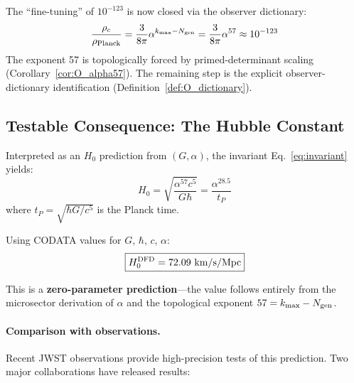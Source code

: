 \begin{tcolorbox}[colback=blue!5!white, colframe=blue!60!black, title=Cosmological Constant: Dictionary-Closed Resolution (Appendix~\ref{app:O_alpha57_clean})]
The ``fine-tuning'' of $10^{-123}$ is now closed via the observer dictionary:
\begin{equation}
\frac{\rho_c}{\rho_{\rm Planck}} = \frac{3}{8\pi}\alpha^{k_{\max} - N_{\rm gen}} = \frac{3}{8\pi}\alpha^{57} \approx 10^{-123}
\end{equation}
The exponent 57 is topologically forced by primed-determinant scaling (Corollary~\ref{cor:O_alpha57}). The remaining step is the explicit observer-dictionary identification (Definition~\ref{def:O_dictionary}).
\end{tcolorbox}

\subsection{Testable Consequence: The Hubble Constant}

Interpreted as an $H_0$ prediction from $(G, \alpha)$, the invariant Eq.~\eqref{eq:invariant} yields:
\begin{equation}
H_0 = \sqrt{\frac{\alpha^{57} c^5}{G\hbar}} = \frac{\alpha^{28.5}}{t_P}
\label{eq:H0-prediction}
\end{equation}
where $t_P = \sqrt{\hbar G/c^5}$ is the Planck time.

Using CODATA values for $G$, $\hbar$, $c$, $\alpha$:
\begin{equation}
\boxed{H_0^{\rm DFD} = 72.09~\text{km/s/Mpc}}
\label{eq:H0-DFD-value}
\end{equation}

This is a \textbf{zero-parameter prediction}---the value follows entirely from the microsector derivation of $\alpha$ and the topological exponent $57 = k_{\max} - N_{\rm gen}$.

\paragraph{Comparison with observations.}
Recent JWST observations provide high-precision tests of this prediction. Two major collaborations have released results:

